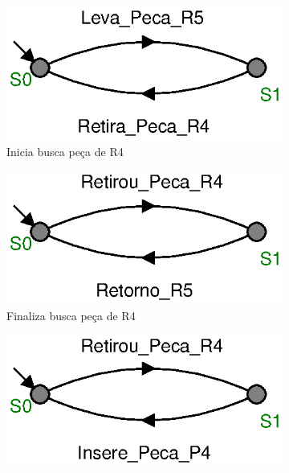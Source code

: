 \begin{figure}[H]%
  \centering
  \begin{subfigure}{0.45\textwidth}
      \centering
      \includegraphics[width=\textwidth]{imagens/E8_inicia_R5.eps}
      \caption{Inicia busca peça de R4}
      \label{fig:e89a}
  \end{subfigure}
  \hfill
  \begin{subfigure}{0.45\textwidth}
      \centering
      \includegraphics[width=\textwidth]{imagens/E8_finaliza_R5.eps}
      \caption{Finaliza busca peça de R4}
      \label{fig:e89b}
  \end{subfigure}
  \hfill
  \begin{subfigure}{0.45\textwidth}
      \centering
      \includegraphics[width=\textwidth]{imagens/E9_inicia_entrega_P4.eps}

\end{subfigure}
\end{figure}
